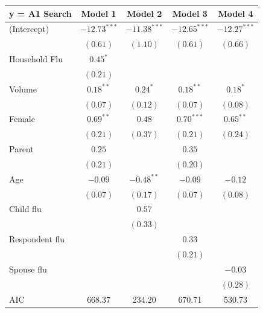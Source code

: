 \documentclass[12pt]{article}
\begin{document}
\begin{table}[h!]
\begin{center}
\begin{tabular}{l c c c c }
\hline
y = A1 Search & Model 1 & Model 2 & Model 3 & Model 4 \\
\hline
(Intercept)    & $-12.73^{***}$ & $-11.38^{***}$ & $-12.65^{***}$ & $-12.27^{***}$ \\
               & $(0.61)$       & $(1.10)$       & $(0.61)$       & $(0.66)$       \\
Household Flu  & $0.45^{*}$     &                &                &                \\
               & $(0.21)$       &                &                &                \\
Volume         & $0.18^{**}$    & $0.24^{*}$     & $0.18^{**}$    & $0.18^{*}$     \\
               & $(0.07)$       & $(0.12)$       & $(0.07)$       & $(0.08)$       \\
Female         & $0.69^{**}$    & $0.48$         & $0.70^{***}$   & $0.65^{**}$    \\
               & $(0.21)$       & $(0.37)$       & $(0.21)$       & $(0.24)$       \\
Parent         & $0.25$         &                & $0.35$         &                \\
               & $(0.21)$       &                & $(0.20)$       &                \\
Age            & $-0.09$        & $-0.48^{**}$   & $-0.09$        & $-0.12$        \\
               & $(0.07)$       & $(0.17)$       & $(0.07)$       & $(0.08)$       \\
Child flu         &                & $0.57$         &                &                \\
               &                & $(0.33)$       &                &                \\
Respondent flu          &                &                & $0.33$         &                \\
               &                &                & $(0.21)$       &                \\
Spouse flu          &                &                &                & $-0.03$        \\
               &                &                &                & $(0.28)$       \\
\hline
AIC            & 668.37         & 234.20         & 670.71         & 530.73         \\

\end{tabular}
\end{center}
\end{table}
\end{document}
